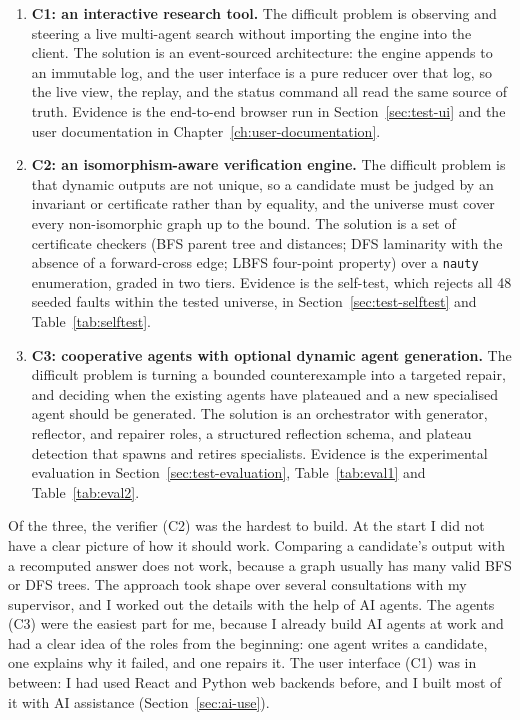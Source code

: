 \begin{enumerate}
  \item \textbf{C1: an interactive research tool.} The difficult problem is
  observing and steering a live multi-agent search without importing the engine
  into the client. The solution is an event-sourced architecture: the engine
  appends to an immutable log, and the user interface is a pure reducer over
  that log, so the live view, the replay, and the status command all read the
  same source of truth. Evidence is the end-to-end browser run in
  Section~\ref{sec:test-ui} and the user documentation in
  Chapter~\ref{ch:user-documentation}.
  \item \textbf{C2: an isomorphism-aware verification engine.} The difficult
  problem is that dynamic outputs are not unique, so a candidate must be judged
  by an invariant or certificate rather than by equality, and the universe must
  cover every non-isomorphic graph up to the bound. The solution is a set of
  certificate checkers (BFS parent tree and distances; DFS laminarity with the
  absence of a forward-cross edge; LBFS four-point property) over a \texttt{nauty}
  enumeration, graded in two tiers. Evidence is the self-test, which rejects
  all 48 seeded faults within the tested universe, in Section~\ref{sec:test-selftest} and Table~\ref{tab:selftest}.
  \item \textbf{C3: cooperative agents with optional dynamic agent generation.}
  The difficult problem is turning a bounded counterexample into a targeted
  repair, and deciding when the existing agents have plateaued and a new
  specialised agent should be generated. The solution is an orchestrator with
  generator, reflector, and repairer roles, a structured reflection schema, and
  plateau detection that spawns and retires specialists. Evidence is the
  experimental evaluation in Section~\ref{sec:test-evaluation},
  Table~\ref{tab:eval1} and Table~\ref{tab:eval2}.
\end{enumerate}

Of the three, the verifier (C2) was the hardest to build. At the start I did not
have a clear picture of how it should work. Comparing a candidate's output with
a recomputed answer does not work, because a graph usually has many valid BFS or
DFS trees. The approach took shape over several consultations with my
supervisor, and I worked out the details with the help of AI agents. The agents
(C3) were the easiest part for me, because I already build AI agents at work and
had a clear idea of the roles from the beginning: one agent writes a candidate,
one explains why it failed, and one repairs it. The user interface (C1) was in
between: I had used React and Python web backends before, and I built most of
it with AI assistance (Section~\ref{sec:ai-use}).

